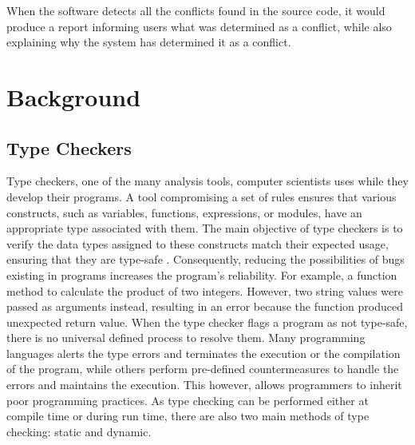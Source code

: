 \documentclass{l4proj}
\begin{document}
When the software detects all the conflicts found in the source code, it would produce a report informing users what was determined as a conflict, while also explaining why the system has determined it as a conflict.

\chapter{Background}

\section{Type Checkers}
\label{sec: what type checker}
Type checkers, one of the many analysis tools, computer scientists uses while they develop their programs. A tool compromising a set of rules ensures that various constructs, such as variables, functions, expressions, or modules, have an appropriate type associated with them. The main objective of type checkers is to verify the data types assigned to these constructs match their expected usage, ensuring that they are type-safe \cite{objective}. Consequently, reducing the possibilities of bugs existing in programs increases the program’s reliability. For example, a function method to calculate the product of two integers. However, two string values were passed as arguments instead, resulting in an error because the function produced unexpected return value. When the type checker flags a program as not type-safe, there is no universal defined process to resolve them. Many programming languages alerts the type errors and terminates the execution or the compilation of the program, while others perform pre-defined countermeasures to handle the errors and maintains the execution\cite{type_check_def}. This however, allows programmers to inherit poor programming practices. As type checking can be performed either at compile time or during run time, there are also two main methods of type checking: static and dynamic.
\end{document}

